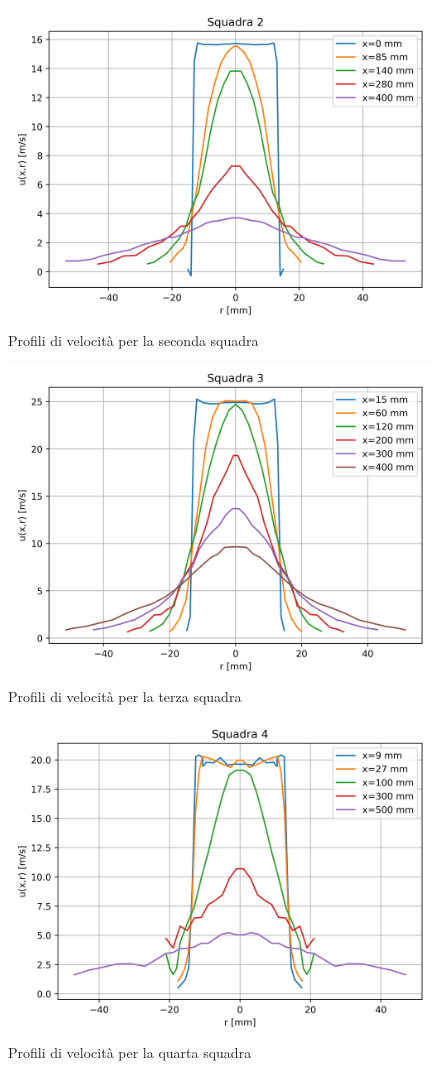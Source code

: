 \begin{figure}[H]
    \centering
    \includegraphics[width=.85\textwidth]{images/3/sq2.png}
    \caption{Profili di velocità per la seconda squadra}
\end{figure}
\begin{figure}[H]
    \centering
    \includegraphics[width=.85\textwidth]{images/3/sq3.png}
    \caption{Profili di velocità per la terza squadra}
\end{figure}
\begin{figure}[H]
    \centering
    \includegraphics[width=.8\textwidth]{images/3/sq4.png}
    \caption{Profili di velocità per la quarta squadra}
\end{figure}

